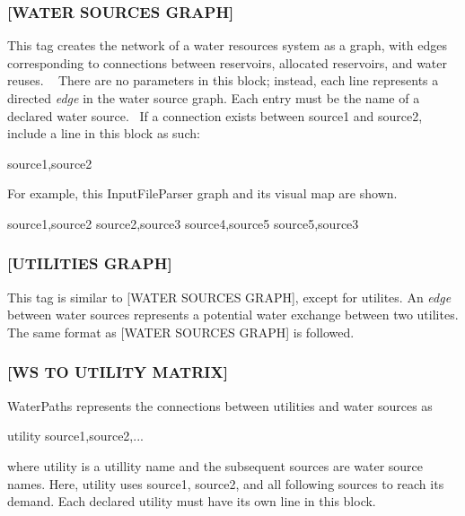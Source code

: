 \subsubsection*{\mbox{[}W\+A\+T\+ER S\+O\+U\+R\+C\+ES G\+R\+A\+PH\mbox{]}}

This tag creates the network of a water resources system as a graph, with edges corresponding to connections between reservoirs, allocated reservoirs, and water reuses. ~\newline
 There are no parameters in this block; instead, each line represents a directed {\itshape edge} in the water source graph. Each entry must be the {\ttfamily name} of a declared water source.~\newline
 If a connection exists between {\ttfamily source1} and {\ttfamily source2}, include a line in this block as such\+: 
\begin{DoxyCode}
source1,source2
\end{DoxyCode}
 For example, this Input\+File\+Parser graph and its visual map are shown. 
\begin{DoxyCode}
source1,source2
source2,source3
source4,source5
source5,source3
\end{DoxyCode}
 

\subsubsection*{\mbox{[}U\+T\+I\+L\+I\+T\+I\+ES G\+R\+A\+PH\mbox{]}}

This tag is similar to \mbox{[}W\+A\+T\+ER S\+O\+U\+R\+C\+ES G\+R\+A\+PH\mbox{]}, except for utilites. An {\itshape edge} between water sources represents a potential water exchange between two utilites. The same format as \mbox{[}W\+A\+T\+ER S\+O\+U\+R\+C\+ES G\+R\+A\+PH\mbox{]} is followed.

\subsubsection*{\mbox{[}WS TO U\+T\+I\+L\+I\+TY M\+A\+T\+R\+IX\mbox{]}}

Water\+Paths represents the connections between utilities and water sources as 
\begin{DoxyCode}
utility source1,source2,...
\end{DoxyCode}
 where {\ttfamily utility} is a utillity name and the subsequent {\ttfamily sources} are water source names. Here, {\ttfamily utility} uses {\ttfamily source1}, {\ttfamily source2}, and all following sources to reach its demand. Each declared utility must have its own line in this block.

